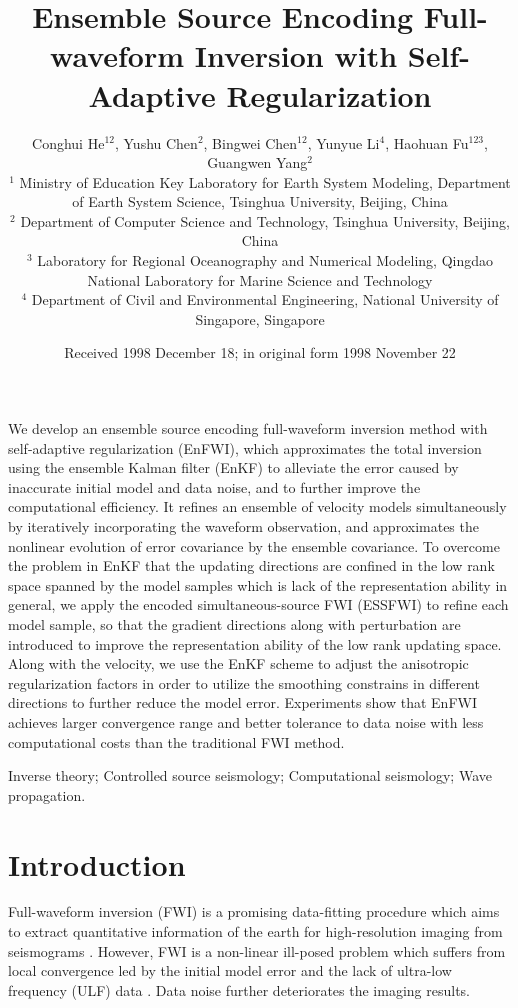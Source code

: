 \documentclass[mreferee]{gji}
\title[Geophys.\ J.\ Int.: \LaTeXe\ Guide for Authors]
	{Ensemble Source Encoding Full-waveform Inversion with Self-Adaptive Regularization}
\author[C. He]
  {Conghui He$^{12}$, Yushu Chen$^2$, Bingwei Chen$^{12}$, Yunyue Li$^4$, Haohuan Fu$^{123}$, Guangwen Yang$^2$ \\
  $^1$ Ministry of Education Key Laboratory for Earth System Modeling, Department of Earth System Science, Tsinghua University, Beijing, China \\
  $^2$ Department of Computer Science and Technology, Tsinghua University, Beijing, China \\
  $^3$ Laboratory for Regional Oceanography and Numerical Modeling, Qingdao National Laboratory for Marine Science and Technology \\
  $^4$ Department of Civil and Environmental Engineering, National University of Singapore, Singapore
  }
\date{Received 1998 December 18; in original form 1998 November 22}
\begin{document}
\label{firstpage}

\maketitle


\begin{summary}
We develop an ensemble source encoding full-waveform inversion method with self-adaptive regularization (EnFWI), which approximates the total inversion using the ensemble Kalman filter (EnKF) to alleviate the error caused by inaccurate initial model and data noise, and to further improve the computational efficiency. It refines an ensemble of velocity models simultaneously by iteratively incorporating the waveform observation, and approximates the nonlinear evolution of error covariance by the ensemble covariance. To overcome the problem in EnKF that the updating directions are confined in the low rank space spanned by the model samples which is lack of the representation ability in general, we apply the encoded simultaneous-source FWI (ESSFWI) to refine each model sample, so that the gradient directions along with perturbation are introduced to improve the representation ability of the low rank updating space. Along with the velocity, we use the EnKF scheme to adjust the anisotropic regularization factors in order to utilize the smoothing constrains in different directions to further reduce the model error. Experiments show that EnFWI achieves larger convergence range and better tolerance to data noise with less computational costs than the traditional FWI method.
\end{summary}

\begin{keywords}
Inverse theory; Controlled source seismology; Computational seismology; Wave propagation.
\end{keywords}

\section{Introduction}

Full-waveform inversion (FWI) is a promising data-fitting procedure which aims to extract quantitative information of the earth for high-resolution imaging from seismograms \cite{ta84}. However, FWI is a non-linear ill-posed problem which suffers from local convergence led by the initial model error and the lack of ultra-low frequency (ULF) data \cite{vi}. Data noise further deteriorates the imaging results.
\end{document}
